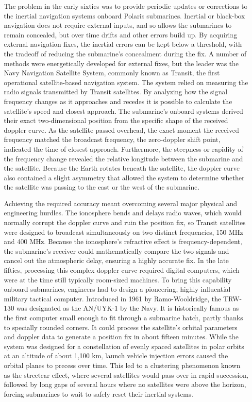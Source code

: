 The problem in the early sixties was to provide periodic updates or corrections to the inertial navigation systems onboard Polaris submarines. Inertial or black-box navigation does not require external inputs, and so allows the submarines to remain concealed, but over time drifts and other errors build up. By acquiring external navigation fixes, the inertial errors can be kept below a threshold, with the tradeoff of reducing the submarine’s concealment during the fix. A number of methods were energetically developed for external fixes, but the leader was the Navy Navigation Satellite System, commonly known as Transit, the first operational satellite-based navigation system. The system relied on measuring the radio signals transmitted by Transit satellites. By analyzing how the signal frequency changes as it approaches and recedes it is possible to calculate the satellite's speed and closest approach. The submarine's onboard systems derived their exact two-dimensional position from the specific shape of the received doppler curve. As the satellite passed overhead, the exact moment the received frequency matched the broadcast frequency, the zero-doppler shift point, indicated the time of closest approach. Furthermore, the steepness or rapidity of the frequency change revealed the relative longitude between the submarine and the satellite. Because the Earth rotates beneath the satellite, the doppler curve also contained a slight asymmetry that allowed the system to determine whether the satellite was passing to the east or the west of the submarine.

Achieving the required accuracy meant overcoming several major physical and engineering hurdles. The ionosphere bends and delays radio waves, which would normally corrupt the doppler curve and ruin the position fix, so Transit satellites were designed to broadcast simultaneously on two distinct frequencies, 150 MHz and 400 MHz. Because the ionosphere's refractive effect is frequency-dependent, the submarine's receiver could mathematically compare the two signals and cancel out the atmospheric delay, ensuring a highly accurate fix. In the late fifties, processing this complex doppler curve required digital computers, which were at the time still typically room-sized machines. To bring this capability onboard submarines, engineers had to design a pioneering, highly influential military tactical computer. Introduced in 1961 by Ramo-Wooldridge, the TRW-130 was designated as the AN/UYK-1 by the Navy. It is historically famous as the first computer small enough to fit through a submarine hatch, partly thanks to specially rounded corners. It could process the satellite's orbital parameters and doppler data to generate a position fix in about fifteen minutes. While the system was designed for a constellation of evenly spaced satellites in polar orbits at an altitude of about 1,100 km, launch vehicle injection errors caused the orbital planes to precess over time. This led to a clustering phenomenon known as the streetcar effect, where several satellites would pass over in rapid succession, followed by long gaps of several hours where no satellites were above the horizon, forcing submarines to wait to safely reset their inertial systems. 

